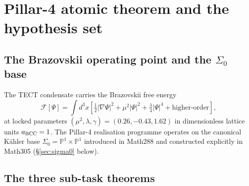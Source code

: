 \section{Pillar-4 atomic theorem and the hypothesis
set}\label{sec:atomic}

\subsection{The Brazovskii operating point and the
$\Sigma_0$ base}

The TECT condensate carries the Brazovskii free energy
\begin{equation}
\mathcal{F}[\Psi] = \int d^3 x \left[
\tfrac{1}{2}|\nabla \Psi|^2 + \mu^2 |\Psi|^2
+ \tfrac{\lambda}{4}|\Psi|^4
+ \text{higher-order}
\right],
\label{eq:brazovskii}
\end{equation}
at locked parameters $(\mu^2, \lambda, \gamma) = (0.26, -0.43, 1.62)$
in dimensionless lattice units $a_{\rm BCC} = 1$. The Pillar-4
realisation programme operates on the canonical Kähler base
$\Sigma_0 = \mathbb{P}^1 \times \mathbb{P}^1$ introduced in Math288
and constructed explicitly in Math305 (\S\ref{sec:sigma0} below).

\subsection{The three sub-task theorems}

